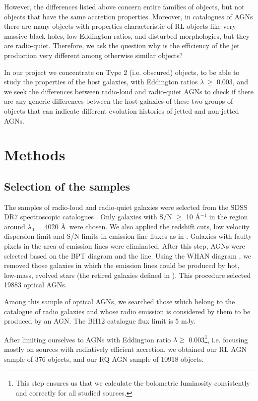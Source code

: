 \documentclass[utf8]{frontiersSCNS}
\begin{document}
However, the differences listed above concern entire families of objects, but not objects that have the same accretion properties.  Moreover, in catalogues of AGNs there are many objects with properties characteristic of RL objects like very massive black holes, low Eddington ratios, and  disturbed morphologies, but they are radio-quiet. Therefore, we ask the question why is the efficiency of the jet production very different among otherwise similar objects?

In our project we concentrate on Type 2 (i.e. obscured) objects, to be able to study the properties of the host galaxies, with Eddington ratios $\lambda\,\geq$ 0.003, and we seek the differences between radio-loud and radio-quiet AGNs to check if there are any generic differences between the host galaxies of these two groups of objects that can indicate different evolution histories of jetted and non-jetted AGNs. 


\section{Methods}

\subsection{Selection of the samples}

The samples of radio-loud and radio-quiet galaxies were selected from the SDSS DR7 spectroscopic catalogues \citep{Abazajian.etal.2009a}. Only galaxies with S/N $\geq$ 10 \AA$^{-1}$ in the region around $\lambda_0$ = 4020 \AA\ were chosen. We also applied the redshift cuts, low velocity dispersion limit and S/N limits in emission line fluxes as in  \citet{KozielWierzbowska.etal.2017a}. Galaxies with faulty pixels in the area of emission lines were eliminated. After this step, AGNs were selected based on the BPT diagram and the \citet{Kewley.etal.2001a} line. 
Using the WHAN diagram \citep{CidFernandes.etal.2011a}, we removed those galaxies in which the emission lines could be produced by hot, low-mass, evolved stars (the retired galaxies  defined in \citealp{Stasinska.etal.2008a}).
This procedure selected 19883 optical AGNs.

Among  this sample of optical AGNs, we searched those which belong to the \citet[][BH12]{Best.Heckman.2012a} catalogue of radio galaxies and whose radio emission is considered by them to be produced by an AGN. The BH12 catalogue flux limit is 5 mJy.

After limiting ourselves to AGNs with Eddington ratio $\lambda \geq$ 0.003\footnote{This step ensures us that we calculate the bolometric luminosity consistently and correctly for all studied sources.}, i.e. focusing mostly on sources with radiatively efficient accretion, we obtained our RL AGN sample of 376 objects, and our RQ AGN sample of 10918 objects. 
\end{document}
